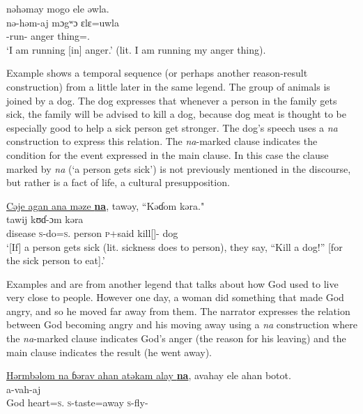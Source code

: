       
nəhəmay  mogo  ele  əwla.\\      
\gll nə-həm-aj  mɔgʷɔ  ɛlɛ=uwla\\ 
     {\oneS}-run{}-{\CL}      anger  thing={\oneS}.{\POSS}\\
\glt  ‘I am running [in] anger.’ (lit. I am running my anger thing). 
\z

 
Example  shows a temporal sequence (or perhaps another reason-result construction) from a little later in the same legend. The group of animals is joined by a dog. The dog expresses that whenever a person in the family gets sick, the family will be advised to kill a dog, because dog meat is thought to be especially good to help a sick person get stronger. The dog’s speech uses a \textit{na} construction to express this relation. The \textit{na}-marked clause indicates the condition for the event expressed in the main clause. In this case the clause marked by \textit{na}{} (‘a person gets sick’) is not previously mentioned in the discourse, but rather is a fact of life, a cultural presupposition. 

\ea \label{ex:11:16}
\underline{Cəje  agan  ana  məze  \textbf{na}},  tawəy,  “Kəɗom  kəra."\\
\gll  {}               tawij   kʊɗ-ɔm     kəra\\
      disease  \textsc{s}-do=\textsc{s}.{\IO}  {\DAT} person  {\PSP}  \textsc{p}+said  kill[{\IMP}]-{\twoP}  dog\\
\glt  ‘[If] a person gets sick (lit. sickness does to person), they say, “Kill a dog!” [for the sick person to eat].’ 
\z

Examples  and  are from another legend that talks about how God used to live very close to people. However one day, a woman did something that made God angry, and so he moved far away from them. The narrator expresses the relation between God becoming angry and his moving away using a \textit{na} construction  where the \textit{na}-marked clause indicates God’s anger (the reason for his leaving) and the main clause indicates the result (he went away). 

\ea \label{ex:11:17}
\underline{Hərmbəlom  na  ɓərav  ahan  atəkam  alay  \textbf{na}},  avahay  ele  ahan  botot.\\
\gll  {}       a-vah-aj \\ 
      God  {\PSP}  heart=\textsc{s}.{\POSS} \textsc{s}-taste=away {\PSP} \textsc{s}-fly{}-{\CL}  \\  
      
